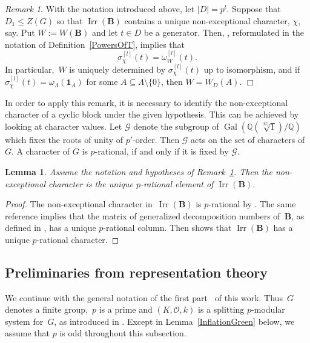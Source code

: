 \documentclass[12pt]{amsart}
\newcommand{\cO}{{\mathcal{O}}}
\newcommand{\bB}{{\mathbf{B}}}
\DeclareMathOperator{\Irr}{Irr}
\DeclareMathOperator{\Gal}{Gal}
\newtheorem{lem}[thm]{Lemma}
\theoremstyle{theorem}
\theoremstyle{definition}
\theoremstyle{remark}
\newtheorem{rem}[thm]{Remark}
\begin{document}
\begin{rem}
\label{SignSequenceRemark}
{\rm
With the notation introduced above, let $|D| = p^l$. Suppose that 
$D_1 \leq Z(G)$ so that $\Irr(\bB)$ contains a unique non-exceptional character, 
$\chi$, say. Put $W := W( \bB )$ and
let $t \in D$ be a generator. Then, \cite[Lemma~$3.3$]{HL24}, reformulated in 
the notation of Definition~\ref{PowersOfT}, implies that
$$\sigma_{\chi}^{[l]}( t ) = \omega_W^{[l]}( t ).$$
In particular,~$W$ is uniquely determined by $\sigma_{\chi}^{[l]}( t )$ up to
isomorphism, and if 
$\sigma_{\chi}^{[l]}( t ) = \omega_{\Lambda}( \mathbf{1}_A )$ for some 
$A \subseteq \Lambda \setminus \{ 0 \}$, then $W = W_D( A )$.
}\hfill{$\Box$}
\end{rem}
In order to apply this remark, it is necessary to identify the non-exceptional
character of a cyclic block under the given hypothesis. This can be achieved by 
looking at character values. Let $\mathcal{G}$ denote the subgroup of
$\Gal( \mathbb{Q}( \sqrt[|G|]{1} )/ \mathbb{Q} )$ which fixes the roots of unity
of $p'$-order. Then $\mathcal{G}$ acts on the set of characters of~$G$. A
character of $G$ is $p$-rational, if and only if it is fixed by $\mathcal{G}$.
\begin{lem}
\label{IdentifyingTheNonExceptional}
Assume the notation and hypotheses of {\rm Remark~\ref{SignSequenceRemark}}. 
Then the non-exceptional character is the unique $p$-rational element of 
$\Irr( \bB )$.
\end{lem}
\begin{proof}
The non-exceptional character in~$\Irr( \bB )$ is $p$-rational by
\cite[Theorem~68.1(8)]{DornhoffB}. The same reference implies that the matrix of 
generalized decomposition numbers of~$\bB$, as defined in 
\cite[Section IV.6, P.~$175$]{Feit}, has a unique $p$-rational column. Then 
\cite[Lemma IV.6.10]{Feit} shows that $\Irr(\bB)$ has a unique $p$-rational 
character. 
\end{proof}

\subsection{Preliminaries from representation theory}
\label{SpecialConfigurations}
We continue with the general notation of the first part~\cite{HL24} of this 
work. Thus~$G$ denotes a finite group,~$p$ is a prime and $(K,\cO,k)$ is a 
splitting $p$-modular system for~$G$, as introduced in 
\cite[Subsection~$2.1$]{HL24}. Except in Lemma~\ref{InflationGreen}
below, we assume that $p$ is odd throughout this subsection.
\end{document}
